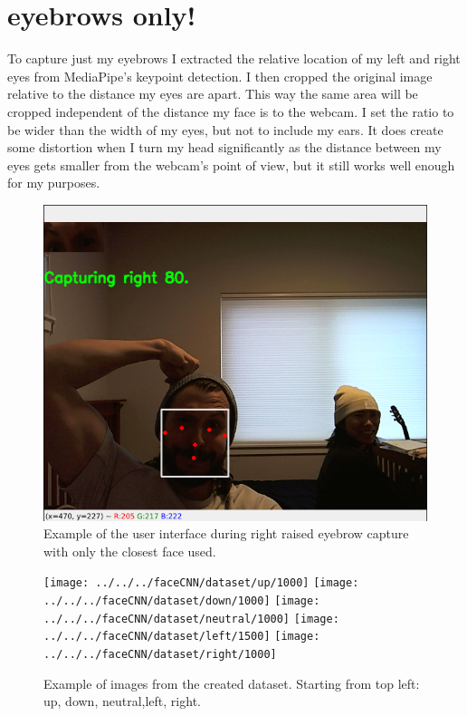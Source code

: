 \documentclass[11pt]{scrartcl} %
\begin{document}
\section{eyebrows only!}
To capture just my eyebrows I extracted the relative location of my left and right eyes from MediaPipe's keypoint detection.
I then cropped the original image relative to the distance my eyes are apart. 
This way the same area will be cropped independent of the distance my face is to the webcam.
I set the ratio to be wider than the width of my eyes, but not to include my ears.
It does create some distortion when I turn my head significantly as the distance between my eyes gets smaller from the webcam's point of view, but it still works well enough for my purposes.

\begin{figure}[ht!] %
	\centering
	\includegraphics[width=0.9\columnwidth]{figures/Capturing-Example} 
	\caption{Example of the user interface during right raised eyebrow capture with only the closest face used.}
\end{figure}

\begin{figure}[ht!] %
	\centering
	\texttt{[image: ../../../faceCNN/dataset/up/1000]} 
	\texttt{[image: ../../../faceCNN/dataset/down/1000]} 
	\texttt{[image: ../../../faceCNN/dataset/neutral/1000]} 
	\texttt{[image: ../../../faceCNN/dataset/left/1500]} 
	\texttt{[image: ../../../faceCNN/dataset/right/1000]} 
	\caption{Example of images from the created dataset. Starting from top left: up, down, neutral,left, right.}
\end{figure}
\end{document}
